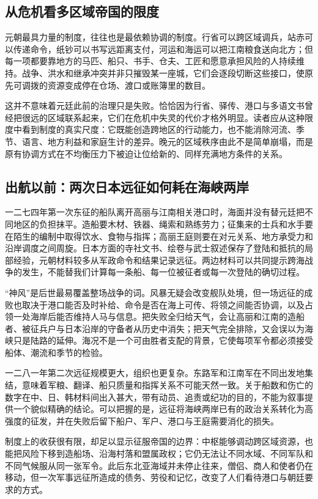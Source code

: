 \subsection{从危机看多区域帝国的限度}

元朝最具力量的制度，往往也是最依赖协调的制度。行省可以跨区域调兵，站赤可以传递命令，纸钞可以书写远距离支付，河运和海运可以把江南粮食送向北方；但每一项都要靠地方的马匹、船只、书手、仓夫、工匠和愿意承担风险的人持续维持。战争、洪水和继承冲突并非只摧毁某一座城，它们会逐段切断这些接口，使原先可调拨的资源变成停在仓场、渡口或账簿里的数目。

这并不意味着元廷此前的治理只是失败。恰恰因为行省、驿传、港口与多语文书曾经把很远的区域联系起来，它们在危机中失灵的代价才格外明显。读者应从这种限度中看到制度的真实尺度：它既能创造跨地区的行动能力，也不能消除河流、季节、语言、地方利益和家庭生计的差异。晚元的区域秩序由此不是简单崩塌，而是原有协调方式在不均衡压力下被迫让位给新的、同样充满地方条件的关系。

\subsection{出航以前：两次日本远征如何耗在海峡两岸}

一二七四年第一次东征的船队离开高丽与江南相关港口时，海面并没有替元廷把不同地区的负担抹平。造船要木材、铁器、绳索和熟练劳力；征集来的士兵和水手要在陌生的编制中取得饮水、食物与指挥；高丽王庭则要在对元关系、地方承受力和沿岸调度之间周旋。日本方面的寺社文书、绘卷与武士叙述保存了登陆和抵抗的局部经验，元朝材料较多从军政命令和结果记录远征。两边材料可以共同提示跨海战争的发生，不能替我们计算每一条船、每一位被征者或每一次登陆的确切过程。

“神风”是后世最易覆盖整场战争的词。风暴无疑会改变舰队处境，但一场远征的成败也取决于港口能否及时补给、命令是否在海上可传、将领之间能否协调，以及占领一处海岸后能否维持人马与信息。把失败全归给天气，会让高丽和江南的造船者、被征兵户与日本沿岸的守备者从历史中消失；把天气完全排除，又会误以为海峡只是陆路的延伸。海况不是一个可由胜者支配的背景，它使每项军令都必须接受船体、潮流和季节的检验。

一二八一年第二次远征规模更大，组织也更复杂。东路军和江南军在不同出发地集结，意味着军粮、翻译、船只质量和指挥关系不可能天然一致。关于船数和伤亡的数字在中、日、韩材料间出入甚大，带有动员、追责或纪功的目的，不能为叙事提供一个貌似精确的结论。可以把握的是，远征将海峡两岸已有的政治关系转化为高强度的征发，并在失败后留下船户、军户、港口与王庭需要消化的损失。

制度上的收获很有限，却足以显示征服帝国的边界：中枢能够调动跨区域资源，也能把风险下移到造船场、沿海村落和盟属政权；它仍无法让不同水域、不同军队和不同气候服从同一张军令。此后东北亚海域并未停止往来，僧侣、商人和使者仍在移动，但一次军事远征所造成的债务、劳役和记忆，改变了人们看待港口与朝廷要求的方式。

